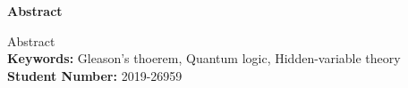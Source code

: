 \thispagestyle{plain}
\begin{center}
    \Large
    \textbf{Abstract}
\end{center}

Abstract\\

\textbf{Keywords:} Gleason's thoerem, Quantum logic, Hidden-variable theory \\

\textbf{Student Number:} 2019-26959
